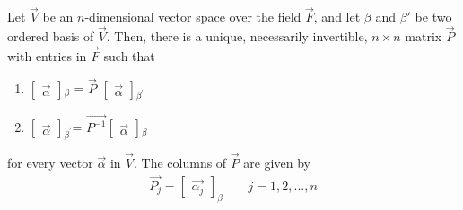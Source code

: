 \begin{theorem} \label{eq:solutions/2/3/4/1}
Let $\vec{V}$ be an $n$-dimensional vector space over the field $\vec{F}$, and let $\beta$ and $\beta'$ be two ordered basis of $\vec{V}$. Then, there is a unique, necessarily invertible, $n\times n$ matrix $\vec{P}$ with entries in $\vec{F}$ such that 
\begin{enumerate}
	\item $\begin{bmatrix}
	\vec{\alpha}
	\end{bmatrix}$$_\beta$ = $\vec{P}$  $\begin{bmatrix}
	\vec{\alpha} 
\end{bmatrix}$$_{\beta^{'}}$
    \item $\begin{bmatrix}
    	\vec{\alpha}
    \end{bmatrix}$$_{\beta^{'}}$= $\vec{P^{-1}}$$\begin{bmatrix}
    \vec{\alpha}	
\end{bmatrix}$$_\beta$
\end{enumerate}
for every vector $\vec{\alpha}$ in $\vec{V}$. The columns of $\vec{P}$ are given by
\begin{align}
\vec{P_j} =  \begin{bmatrix}
	\vec{\alpha_j}
\end{bmatrix}_{\beta}	\qquad j = 1,2,...,n
\end{align}
\end{theorem}
